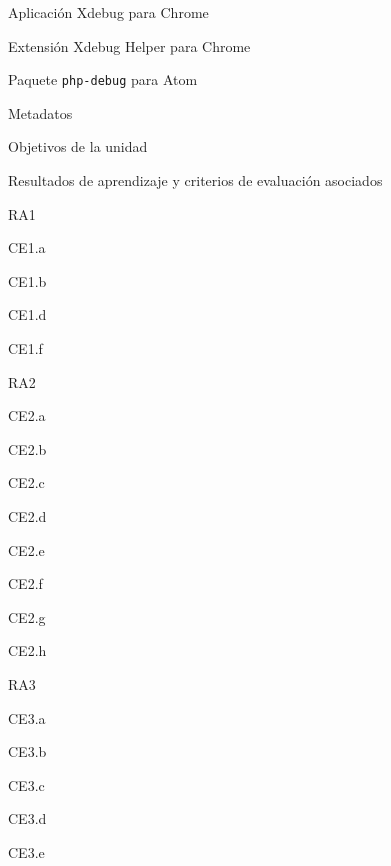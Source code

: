 \begin{longenum}
\begin{longenum}
\begin{longenum}
\begin{longenum}
                \item Aplicación Xdebug para Chrome
                \item Extensión Xdebug Helper para Chrome
                \item Paquete \texttt{php-debug} para Atom
            \end{longenum}
        \end{longenum}
        \item Metadatos
        \begin{longenum}
            \item Objetivos de la unidad
            \item Resultados de aprendizaje y criterios de evaluación asociados
            \begin{longenum}
                \item RA1
                \begin{longenum}
                    \item CE1.a
                    \item CE1.b
                    \item CE1.d
                    \item CE1.f
                \end{longenum}
                \item RA2
                \begin{longenum}
                    \item CE2.a
                    \item CE2.b
                    \item CE2.c
                    \item CE2.d
                    \item CE2.e
                    \item CE2.f
                    \item CE2.g
                    \item CE2.h
                \end{longenum}
                \item RA3
                \begin{longenum}
                    \item CE3.a
                    \item CE3.b
                    \item CE3.c
                    \item CE3.d
                    \item CE3.e

\end{longenum}
\end{longenum}
\end{longenum}
\end{longenum}
\end{longenum}

